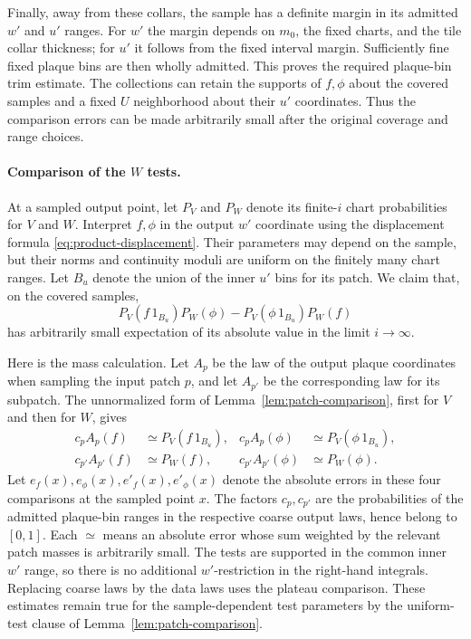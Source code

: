 Finally, away from these collars, the sample has a definite
margin in its admitted \(w'\) and \(u'\) ranges.  For \(w'\) the
margin depends on \(m_0\), the fixed charts, and the tile
collar thickness; for \(u'\) it follows from the fixed interval
margin.  Sufficiently fine fixed plaque bins are then wholly
admitted.  This proves the required plaque-bin trim estimate.
The collections can retain the supports of \(f,\phi\) about
the covered samples and a fixed \(U\) neighborhood about their
\(u'\) coordinates.  Thus the comparison errors can be made
arbitrarily small after the original coverage and range choices.

\paragraph{Comparison of the \(W\) tests.}
At a sampled output point, let \(P_V\) and \(P_W\) denote its
finite-\(i\) chart probabilities for \(V\) and \(W\).
Interpret \(f,\phi\) in the output \(w'\) coordinate using the
displacement formula \eqref{eq:product-displacement}.  Their
parameters may depend on the sample, but their norms and
continuity moduli are uniform on the finitely many chart ranges.
Let \(B_u\) denote the union of the inner \(u'\) bins for its
patch.  We claim that, on the covered samples,
\begin{equation}\label{eq:w-cross-product}
             P_V(f\,1_{B_u})P_W(\phi)
                    -P_V(\phi\,1_{B_u})P_W(f)
\end{equation}
has arbitrarily small expectation of its absolute value in the
limit \(i\to\infty\).

Here is the mass calculation.  Let \(A_p\) be the law of the
output plaque coordinates when sampling the input patch \(p\),
and let \(A_{p'}\) be the corresponding law for its subpatch.
The unnormalized form of Lemma~\ref{lem:patch-comparison},
first for \(V\) and then for \(W\), gives
\[
 \begin{aligned}
       c_p A_p(f)&\simeq P_V(f\,1_{B_u}),&
       c_p A_p(\phi)&\simeq P_V(\phi\,1_{B_u}),\\
       c_{p'} A_{p'}(f)&\simeq P_W(f),&
       c_{p'} A_{p'}(\phi)&\simeq P_W(\phi).
 \end{aligned}
\]
Let \(e_f(x),e_\phi(x),e'_f(x),e'_\phi(x)\) denote the absolute
errors in these four comparisons at the sampled point \(x\).
The factors \(c_p,c_{p'}\) are the probabilities of the admitted
plaque-bin ranges in the respective coarse output laws, hence
belong to \([0,1]\).  Each \(\simeq\) means an absolute error whose
sum weighted by the relevant patch masses is arbitrarily small.
The tests are supported in the common inner \(w'\) range, so
there is no additional \(w'\)-restriction in the right-hand
integrals.  Replacing coarse laws by the data laws uses the
plateau comparison.  These estimates remain true for the
sample-dependent test parameters by the uniform-test clause
of Lemma~\ref{lem:patch-comparison}.

